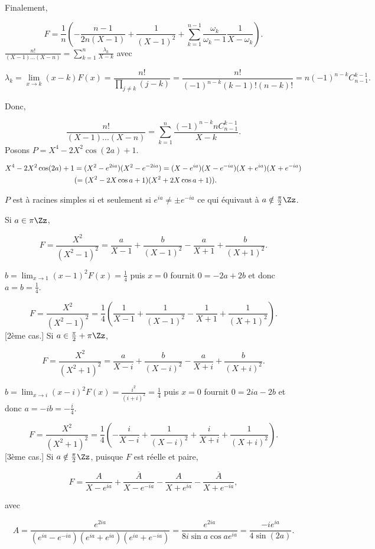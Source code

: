{{Finalement,

$$F=\frac{1}{n}(-\frac{n-1}{2n(X-1)}+\frac{1}{(X-1)^2}+\sum_{k=1}^{n-1}\frac{\omega_k}{\omega_k-1}\frac{1}{X-\omega_k}).$$
$\frac{n!}{(X-1)...(X-n)}=\sum_{k=1}^{n}\frac{\lambda_k}{X-k}$ avec

$$\lambda_k=\lim_{x\rightarrow k}(x-k)F(x)=\frac{n!}{\prod_{j\neq k}^{}(j-k)}=\frac{n!}{(-1)^{n-k}(k-1)!(n-k)!}=n(-1)^{n-k}C_{n-1}^{k-1}.$$

Donc,

$$\frac{n!}{(X-1)...(X-n)}=\sum_{k=1}^{n}\frac{(-1)^{n-k}nC_{n-1}^{k-1}}{X-k}.$$
Posons $P=X^4-2X^2\cos(2a)+1$.

\begin{align*}\ensuremath
X^4-2X^2\cos(2a)+1&=(X^2-e^{2ia})(X^2-e^{-2ia})=(X-e^{ia})(X-e^{-ia})(X+e^{ia})(X+e^{-ia})\\
 &(=(X^2-2X\cos a+1)(X^2+2X\cos a+1)).
\end{align*}

$P$ est à racines simples si et seulement si $e^{ia}\neq\pm e^{-ia}$ ce qui équivaut à $a\notin\frac{\pi}{2}\Zz$.

\begin{itemize}
[1er cas.] Si $a\in\pi\Zz$,

$$F=\frac{X^2}{(X^2-1)^2}=\frac{a}{X-1}+\frac{b}{(X-1)^2}-\frac{a}{X+1}+\frac{b}{(X+1)^2}.$$

$b=\lim_{x\rightarrow 1}(x-1)^2F(x)=\frac{1}{4}$ puis $x=0$ fournit $0=-2a+2b$ et donc $a=b=\frac{1}{4}$.

$$F=\frac{X^2}{(X^2-1)^2}=\frac{1}{4}(\frac{1}{X-1}+\frac{1}{(X-1)^2}-\frac{1}{X+1}+\frac{1}{(X+1)^2}).$$
[2ème cas.] Si $a\in\frac{\pi}{2}+\pi\Zz$,

$$F=\frac{X^2}{(X^2+1)^2}=\frac{a}{X-i}+\frac{b}{(X-i)^2}-\frac{a}{X+i}+\frac{b}{(X+i)^2}.$$

$b=\lim_{x\rightarrow i}(x-i)^2F(x)=\frac{i^2}{(i+i)^2}=\frac{1}{4}$ puis $x=0$ fournit $0=2ia-2b$ et donc $a=-ib=-\frac{i}{4}$.

$$F=\frac{X^2}{(X^2+1)^2}=\frac{1}{4}(-\frac{i}{X-i}+\frac{1}{(X-i)^2}+\frac{i}{X+i}+\frac{1}{(X+i)^2}).$$
[3ème cas.] Si $a\notin\frac{\pi}{2}\Zz$, puisque $F$ est réelle et paire,

$$F=\frac{A}{X-e^{ia}}+\frac{\overline{A}}{X-e^{-ia}}-\frac{A}{X+e^{ia}}-\frac{\overline{A}}{X+e^{-ia}},$$

avec 

$$A=\frac{e^{2ia}}{(e^{ia}-e^{-ia})(e^{ia}+e^{ia})(e^{ia}+e^{-ia})}=\frac{e^{2ia}}{8i\sin a\cos ae^{ia}}=\frac{-ie^{ia}}{4\sin(2a)}.$$


\end{itemize}}}
